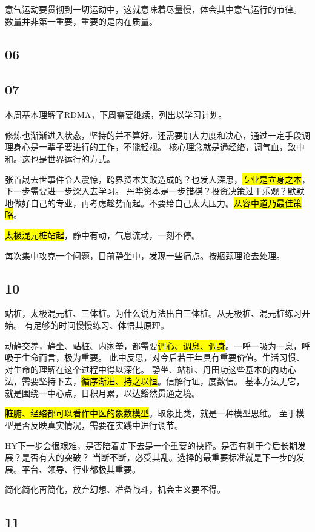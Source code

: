 意气运动要贯彻到一切运动中，这就意味着尽量慢，体会其中意气运行的节律。
数量并非第一重要，重要的是内在质量。

\subsection{06}

\subsection{07}

本周基本理解了RDMA，下周需要继续，列出以学习计划。

修炼也渐渐进入状态，坚持的并不算好。还需要加大力度和决心，通过一定手段调理身心是一辈子要进行的工作，不能轻视。
核心理念就是通经络，调气血，致中和。这也是世界运行的方式。

张首晟去世事件令人震惊，跨界资本失败造成的？也发人深思，\hl{专业是立身之本}，下一步需要进一步深入去学习。
丹华资本是一步错棋？投资决策过于乐观？默默地做好自己的专业，再考虑趁势而起。不要给自己太大压力。\hl{从容中道乃最佳策略}。

\hl{太极混元桩站起}，静中有动，气息流动，一刻不停。

每次集中攻克一个问题，目前静坐中，发现一些痛点。按瓶颈理论去处理。

\subsection{10}

站桩，太极混元桩、三体桩。为什么说万法出自三体桩。从无极桩、混元桩练习开始。
有足够的时间慢慢练习、体悟其原理。

动静交养，静坐、站桩、内家拳，都需要\hl{调心、调息、调身}。一呼一吸为一息，呼吸于生命而言，极为重要。
此中反思，对今后若干年具有重要价值。生活习惯、对生命的理解在这个过程中得以深化。
静坐、站桩、丹田功这些基本的内功心法，需要坚持下去，\hl{循序渐进、持之以恒}。信解行证，度数信。
基本方法无它，就是围绕一中心点，日积月累，以达豁然贯通之境。

\hl{脏腑、经络都可以看作中医的象数模型}。取象比类，就是一种模型思维。
至于模型是否反映真实情况，需要在实践中进行调节。

HY下一步会很艰难，是否陪着走下去是一个重要的抉择。是否有利于今后长期发展？是否有大的突破？
当断不断，必受其乱。选择的最重要标准就是下一步的发展。平台、领导、行业都极其重要。

简化简化再简化，放弃幻想、准备战斗，机会主义要不得。

\subsection{11}

